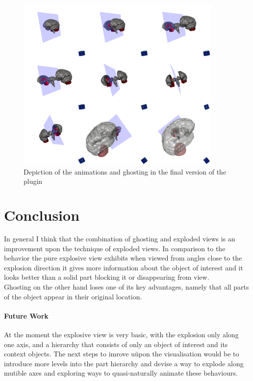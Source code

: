 \begin{figure}[tb]
	\centering
	\includegraphics[width=0.9\textwidth]{chapters/figures/brainstem}
	\caption{Depiction of the animations and ghosting in the final version of the plugin}
	\label{fig:brainstem}
\end{figure}
\chapter{Conclusion}
In general I think that the combination of ghosting and exploded views is an improvement upon the technique of exploded views.  In comparison to the behavior the pure explosive view exhibits when viewed from angles close to the explosion direction it gives more information about the object of interest and it looks better than a solid part blocking it or disappearing from view.\\
Ghosting on the other hand loses one of its key advantages, namely that all parts of the object appear in their original location.
\subsubsection{Future Work}
At the moment the explosive view is very basic, with the explosion only along one axis, and a hierarchy that consists of only  an object of interest and its context objects. The next steps to imrove uüpon the visualisation would be to introduce more levels into the part hierarchy and devise a way to explode along mutible axes and exploring ways to quasi-naturally animate these behaviours.